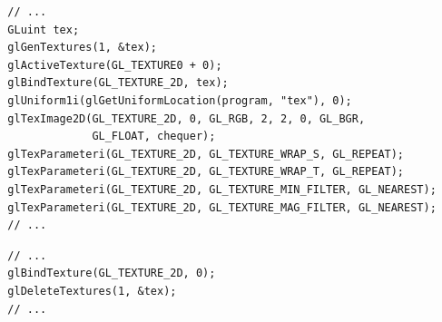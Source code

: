 \documentclass[calcdimensions,landscape,letterpaper]{powersem}
\newcommand{\thecurrentheading}{}
\newcommand{\heading}[1]{\renewcommand{\thecurrentheading}{#1}}
\begin{document}
\begin{slide}
    \heading{Textures: Setup}
    \begin{center}
        \begin{minipage}[c]{\textwidth}
            \begin{verbatim}
  // ...
  GLuint tex;
  glGenTextures(1, &tex);
  glActiveTexture(GL_TEXTURE0 + 0);
  glBindTexture(GL_TEXTURE_2D, tex);
  glUniform1i(glGetUniformLocation(program, "tex"), 0);
  glTexImage2D(GL_TEXTURE_2D, 0, GL_RGB, 2, 2, 0, GL_BGR,
               GL_FLOAT, chequer);
  glTexParameteri(GL_TEXTURE_2D, GL_TEXTURE_WRAP_S, GL_REPEAT);
  glTexParameteri(GL_TEXTURE_2D, GL_TEXTURE_WRAP_T, GL_REPEAT);
  glTexParameteri(GL_TEXTURE_2D, GL_TEXTURE_MIN_FILTER, GL_NEAREST);
  glTexParameteri(GL_TEXTURE_2D, GL_TEXTURE_MAG_FILTER, GL_NEAREST);
  // ...
            \end{verbatim}
        \end{minipage}
    \end{center}
\end{slide}

\begin{slide}
    \heading{Textures: Cleanup}
    \begin{center}
        \begin{minipage}[c]{.6\textwidth}
            \begin{verbatim}
  // ...
  glBindTexture(GL_TEXTURE_2D, 0);
  glDeleteTextures(1, &tex);
  // ...
            \end{verbatim}
        \end{minipage}
    \end{center}
\end{slide}

\begin{slide}
    \heading{Textures: Result}
    \begin{center}
    \end{center}
\end{slide}
\end{document}
